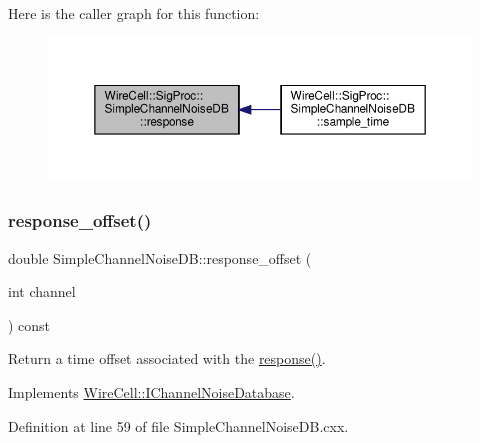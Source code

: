 Here is the caller graph for this function\+:
\nopagebreak
\begin{figure}[H]
\begin{center}
\leavevmode
\includegraphics[width=350pt]{class_wire_cell_1_1_sig_proc_1_1_simple_channel_noise_d_b_ac86433de014502928205161b6ea93ba0_icgraph}
\end{center}
\end{figure}
\mbox{\label{class_wire_cell_1_1_sig_proc_1_1_simple_channel_noise_d_b_a089731ed6979ee7a3d5029dc6c104902}} 
\subsubsection{\texorpdfstring{response\+\_\+offset()}{response\_offset()}}
{\footnotesize\ttfamily double Simple\+Channel\+Noise\+D\+B\+::response\+\_\+offset (\begin{DoxyParamCaption}\item[{int}]{channel }\end{DoxyParamCaption}) const\hspace{0.3cm}{\ttfamily [virtual]}}



Return a time offset associated with the \hyperlink{class_wire_cell_1_1_sig_proc_1_1_simple_channel_noise_d_b_ac86433de014502928205161b6ea93ba0}{response()}. 



Implements \hyperlink{class_wire_cell_1_1_i_channel_noise_database_a5a1d081b5cd6d32ac7209b99eb2c61dc}{Wire\+Cell\+::\+I\+Channel\+Noise\+Database}.



Definition at line 59 of file Simple\+Channel\+Noise\+D\+B.\+cxx.

